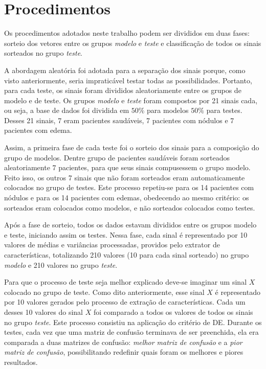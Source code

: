 \documentclass[a4paper,12pt,oneside]{report}
\begin{document}
\section{Procedimentos}
\hspace*{+15pt} Os procedimentos adotados neste trabalho podem ser divididos em duas fases: sor\-tei\-o dos vetores entre os grupos \emph{modelo} e \emph{teste} e classifica\c{c}\~{a}o de todos os sinais sorteados no grupo \emph{teste}. 
\\
\par A abordagem aleat\'{o}ria foi adotada para a separa\c{c}\~{a}o dos sinais porque, como visto anteriormente, seria impratic\'{a}vel testar todas as possibilidades. Portanto, para cada teste, os sinais foram divididos aleatoriamente entre os grupos de modelo e de teste. Os grupos \emph{modelo} e \emph{teste} foram compostos por 21 sinais cada, ou seja, a base de dados foi dividida em $50\%$ para modelos $50\%$ para testes. Desses 21 sinais, 7 eram pacientes saud\'{a}veis, 7 pacientes com n\'{o}dulos e 7 pacientes com edema. 
\\
\par Assim, a primeira fase de cada teste foi o sorteio dos sinais para a composi\c{c}\~{a}o do grupo de modelos. Dentre grupo de pacientes saud\'{a}veis foram sorteados aleatoriamente 7 pacientes, para que seus sinais compusessem o grupo modelo. Feito isso, os outros 7 sinais que n\~{a}o foram sorteados eram automaticamente colocados no grupo de testes. Este processo repetiu-se para os 14 pacientes com n\'{o}dulos e para os 14 pacientes com edemas, obedecendo ao mesmo crit\'{e}rio: os sorteados eram colocados como modelos, e n\~{a}o sorteados colocados como testes.  
\\
\par Ap\'{o}s a fase de sorteio, todos os dados estavam divididos entre os grupos modelo e teste, iniciando assim os testes. Nessa fase, cada sinal \'{e} representado por 10 valores de m\'{e}dias e vari\^{a}ncias processadas, providos pelo extrator de caracter\'{i}sticas, totalizando 210 valores (10 para cada sinal sorteado) no grupo \emph{modelo} e 210 valores no grupo \emph{teste}. 	
\\
\par Para que o processo de teste seja melhor explicado deve-se imaginar um sinal $X$ colocado no grupo de teste. Como dito anteriormente, esse sinal $X$ \'{e} representado por 10 valores gerados pelo processo de extra\c{c}\~{a}o de caracter\'{i}sticas. Cada um desses 10 valores do sinal $X$ foi comparado a todos os valores de todos os sinais no grupo \emph{teste}. Este processo consistiu na aplica\c{c}\~{a}o do crit\'{e}rio de DE. Durante os testes, cada vez que uma matriz de confus\~{a}o terminava de ser preenchida, ela era comparada a duas matrizes de confus\~{a}o: \emph{melhor matriz de confus\~{a}o} e a \emph{pior matriz de confus\~{a}o}, possibilitando redefinir quais foram os melhores e piores resultados. 
\end{document}
